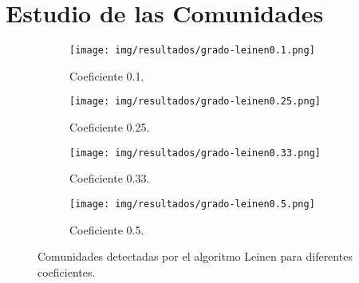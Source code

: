 \section{Estudio de las Comunidades}

\begin{figure}
  \centering  
  \begin{subfigure}[t]{0.48\textwidth}
    \centering
    \texttt{[image: img/resultados/grado-leinen0.1.png]}
    \caption{Coeficiente 0.1.}
  \end{subfigure}
  \vspace{7mm}
  \hfill
  \begin{subfigure}[t]{0.48\textwidth}
    \centering
    \texttt{[image: img/resultados/grado-leinen0.25.png]}
    \caption{Coeficiente 0.25.}
  \end{subfigure}
  \hfill
  \begin{subfigure}[t]{0.48\textwidth}
    \centering
    \texttt{[image: img/resultados/grado-leinen0.33.png]}
    \caption{Coeficiente 0.33.}
  \end{subfigure}
  \hfill
  \begin{subfigure}[t]{0.48\textwidth}
    \centering
    \texttt{[image: img/resultados/grado-leinen0.5.png]}
    \caption{Coeficiente 0.5.}
  \end{subfigure}

  \caption{Comunidades detectadas por el algoritmo Leinen para diferentes coeficientes.}
\end{figure}